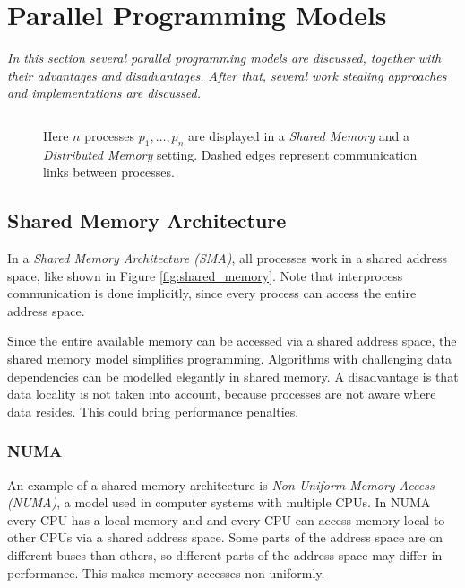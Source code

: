 \chapter{Parallel Programming Models}

\textit{In this section several parallel programming models are discussed, together with their advantages and disadvantages. After that, several work stealing approaches and implementations are discussed.}

\begin{figure}
	\centering
	$\hspace{36pt}$

	\caption{Here $n$ processes $p_1, \dots, p_n$ are displayed in a \emph{Shared Memory} and a \emph{Distributed Memory} setting. Dashed edges represent communication links between processes.}
	\label{fig:shared_distributed_memory}
\end{figure}

\section{Shared Memory Architecture}
In a \emph{Shared Memory Architecture (SMA)}, all processes work in a shared address space, like shown in Figure \ref{fig:shared_memory}. Note that interprocess communication is done implicitly, since every process can access the entire address space.

Since the entire available memory can be accessed via a shared address space, the shared memory model simplifies programming. Algorithms with challenging data dependencies can be modelled elegantly in shared memory. A disadvantage is that data locality is not taken into account, because processes are not aware where data resides. This could bring performance penalties.

\subsection{NUMA}
An example of a shared memory architecture is \emph{Non-Uniform Memory Access (NUMA)}, a model used in computer systems with multiple CPUs. In NUMA every CPU has a local memory and and every CPU can access memory local to other CPUs via a shared address space. Some parts of the address space are on different buses than others, so different parts of the address space may differ in performance. This makes memory accesses non-uniformly.

